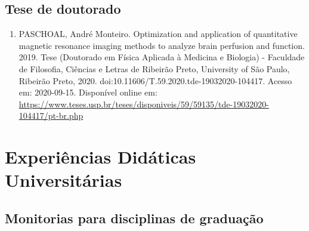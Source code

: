 \documentclass[a4paper,oneside,10pt]{article}
\begin{document}
\subsection{Tese de doutorado}
\vspace{0.3cm}

\begin{enumerate}
\renewcommand{\labelenumi}{{\large\bfseries\arabic{enumi}.}}

        \item PASCHOAL, André Monteiro. Optimization and application of quantitative magnetic resonance imaging methods to analyze brain perfusion and function. 2019. Tese (Doutorado em Física Aplicada à Medicina e Biologia) - Faculdade de Filosofia, Ciências e Letras de Ribeirão Preto, University of São Paulo, Ribeirão Preto, 2020. doi:10.11606/T.59.2020.tde-19032020-104417. Acesso em: 2020-09-15. Disponível online em: \url{https://www.teses.usp.br/teses/disponiveis/59/59135/tde-19032020-104417/pt-br.php}

\end{enumerate}

\newpage
\section{Experiências Didáticas Universitárias}
\subsection{Monitorias para disciplinas de graduação}
\vspace{0.3cm}
\end{document}
